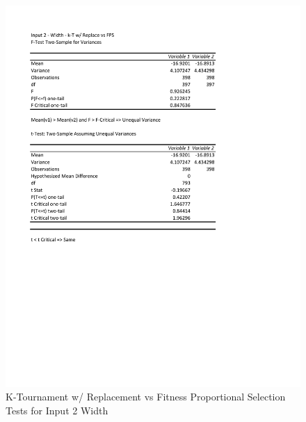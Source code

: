 \documentclass[times]{article}
\begin{document}
	\begin{figure}
		\caption{K-Tournament w/ Replacement vs Fitness Proportional Selection Tests for Input 2 Width}
		\label{fig:2parent1_moea}
		\includegraphics[width=\textwidth]{./t_test/2_parent1_moea.pdf}
	\end{figure}
\end{document}
